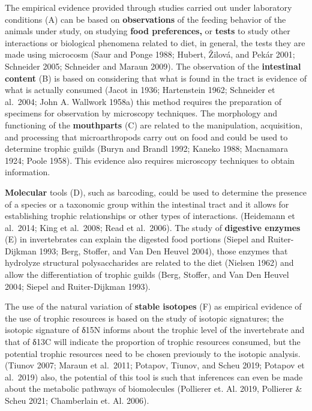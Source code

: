 \documentclass[11pt]{article}
\begin{document}
The empirical evidence provided through studies carried out under
laboratory conditions (A) can be based on \textbf{observations} of the
feeding behavior of the animals under study, on studying \textbf{food
preferences,} or \textbf{tests} to study other interactions or
biological phenomena related to diet, in general, the tests they are
made using microcosm (Saur and Ponge 1988; Hubert, Žilová, and Pekár
2001; Schneider 2005; Schneider and Maraun 2009). The observation of the
\textbf{intestinal content} (B) is based on considering that what is
found in the tract is evidence of what is actually consumed (Jacot in
1936; Hartenstein 1962; Schneider et al.~2004; John A. Wallwork 1958a)
this method requires the preparation of specimens for observation by
microscopy techniques. The morphology and functioning of the
\textbf{mouthparts} (C) are related to the manipulation, acquisition,
and processing that microarthropods carry out on food and could be used
to determine trophic guilds (Buryn and Brandl 1992; Kaneko 1988;
Macnamara 1924; Poole 1958). This evidence also requires microscopy
techniques to obtain information.

\textbf{Molecular} tools (D), such as barcoding, could be used to
determine the presence of a species or a taxonomic group within the
intestinal tract and it allows for establishing trophic relationships or
other types of interactions. (Heidemann et al.~2014; King et al.~2008;
Read et al.~2006). The study of \textbf{digestive enzymes} (E) in
invertebrates can explain the digested food portions (Siepel and
Ruiter-Dijkman 1993; Berg, Stoffer, and Van Den Heuvel 2004), those
enzymes that hydrolyze structural polysaccharides are related to the
diet (Nielsen 1962) and allow the differentiation of trophic guilds
(Berg, Stoffer, and Van Den Heuvel 2004; Siepel and Ruiter-Dijkman
1993).

The use of the natural variation of \textbf{stable isotopes} (F) as
empirical evidence of the use of trophic resources is based on the study
of isotopic signatures; the isotopic signature of δ15N informs about the
trophic level of the invertebrate and that of δ13C will indicate the
proportion of trophic resources consumed, but the potential trophic
resources need to be chosen previously to the isotopic analysis. (Tiunov
2007; Maraun et al.~2011; Potapov, Tiunov, and Scheu 2019; Potapov et
al.~2019) also, the potential of this tool is such that inferences can
even be made about the metabolic pathways of biomolecules (Pollierer et.
Al. 2019, Pollierer \& Scheu 2021; Chamberlain et. Al. 2006).
\end{document}
